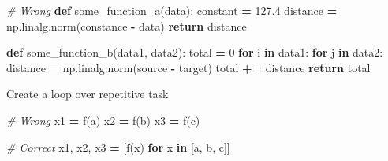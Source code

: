 \documentclass[
]{book}
\newenvironment{Shaded}{\begin{snugshade}}{\end{snugshade}}
\newcommand{\CommentTok}[1]{\textcolor[rgb]{0.56,0.35,0.01}{\textit{#1}}}
\newcommand{\ControlFlowTok}[1]{\textcolor[rgb]{0.13,0.29,0.53}{\textbf{#1}}}
\newcommand{\DecValTok}[1]{\textcolor[rgb]{0.00,0.00,0.81}{#1}}
\newcommand{\FloatTok}[1]{\textcolor[rgb]{0.00,0.00,0.81}{#1}}
\newcommand{\KeywordTok}[1]{\textcolor[rgb]{0.13,0.29,0.53}{\textbf{#1}}}
\newcommand{\NormalTok}[1]{#1}
\newcommand{\OperatorTok}[1]{\textcolor[rgb]{0.81,0.36,0.00}{\textbf{#1}}}
\begin{document}
\begin{Shaded}
\begin{Highlighting}[]
\CommentTok{\# Wrong }
\KeywordTok{def}\NormalTok{ some\_function\_a(data):}
\NormalTok{    constant }\OperatorTok{=} \FloatTok{127.4}
\NormalTok{    distance }\OperatorTok{=}\NormalTok{ np.linalg.norm(constance }\OperatorTok{{-}}\NormalTok{ data)}
    \ControlFlowTok{return}\NormalTok{ distance}

\KeywordTok{def}\NormalTok{ some\_function\_b(data1, data2):}
\NormalTok{    total }\OperatorTok{=} \DecValTok{0}
    \ControlFlowTok{for}\NormalTok{ i }\KeywordTok{in}\NormalTok{ data1:}
        \ControlFlowTok{for}\NormalTok{ j }\KeywordTok{in}\NormalTok{ data2:}
\NormalTok{            distance }\OperatorTok{=}\NormalTok{ np.linalg.norm(source }\OperatorTok{{-}}\NormalTok{ target)}
\NormalTok{            total }\OperatorTok{+=}\NormalTok{ distance}
    \ControlFlowTok{return}\NormalTok{ total}
\end{Highlighting}
\end{Shaded}

Create a loop over repetitive task

\begin{Shaded}
\begin{Highlighting}[]
\CommentTok{\# Wrong }
\NormalTok{x1 }\OperatorTok{=}\NormalTok{ f(a)}
\NormalTok{x2 }\OperatorTok{=}\NormalTok{ f(b)}
\NormalTok{x3 }\OperatorTok{=}\NormalTok{ f(c)}

\CommentTok{\# Correct }
\NormalTok{x1, x2, x3 }\OperatorTok{=}\NormalTok{ [f(x) }\ControlFlowTok{for}\NormalTok{ x }\KeywordTok{in}\NormalTok{ [a, b, c]]}
\end{Highlighting}
\end{Shaded}


  
\end{document}
